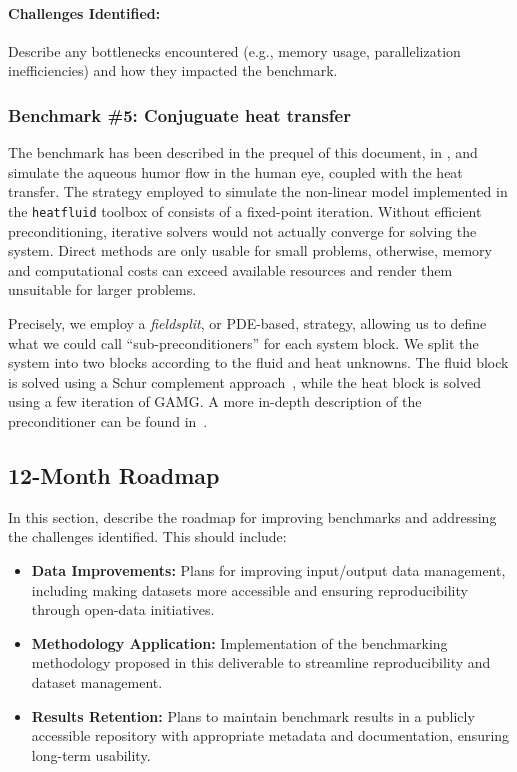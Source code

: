 \paragraph{Challenges Identified:} Describe any bottlenecks encountered (e.g., memory usage, parallelization inefficiencies) and how they impacted the benchmark.

\subsubsection{Benchmark \#5: Conjuguate heat transfer}



The benchmark has been described in the prequel of this document, in , and simulate the aqueous humor flow in the human eye, coupled with the heat transfer.
The strategy employed to simulate the non-linear model implemented in the \texttt{heatfluid} toolbox of \Feelpp consists of a fixed-point iteration.
Without efficient preconditioning, iterative solvers would not actually converge for solving the system.
Direct methods are only usable for small problems, otherwise, memory and computational costs can exceed available resources and render them unsuitable for larger problems.

Precisely, we employ a \emph{fieldsplit}, or PDE-based, strategy, allowing us to define what we could call ``sub-preconditioners'' for each system block.
We split the system into two blocks according to the fluid and heat unknowns.
The fluid block is solved using a Schur complement approach~\cite{elman_finite_2014}, while the heat block is solved using a few iteration of GAMG.
%
A more in-depth description of the preconditioner can be found in~\cite{saigre_coupled_2024_paper}.


\subsection{12-Month Roadmap}
\label{sec:WP3:Feelpp:roadmap}

In this section, describe the roadmap for improving benchmarks and addressing the challenges identified. This should include:
\begin{itemize}
    \item \textbf{Data Improvements:} Plans for improving input/output data management, including making datasets more accessible and ensuring reproducibility through open-data initiatives.
    \item \textbf{Methodology Application:} Implementation of the benchmarking methodology proposed in this deliverable to streamline reproducibility and dataset management.
    \item \textbf{Results Retention:} Plans to maintain benchmark results in a publicly accessible repository with appropriate metadata and documentation, ensuring long-term usability.
\end{itemize}

